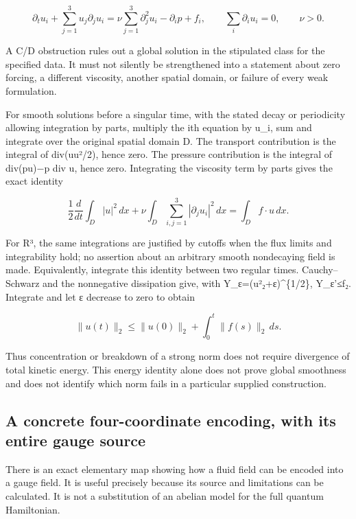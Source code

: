\[
\partial_tu_i+\sum_{j=1}^3u_j\partial_ju_i
=\nu\sum_{j=1}^3\partial_j^2u_i-\partial_ip+f_i,
\qquad \sum_i\partial_iu_i=0,\qquad \nu>0.
\]

A C/D obstruction rules out a global solution in the stipulated class
for the specified data. It must not silently be strengthened into a
statement about zero forcing, a different viscosity, another spatial
domain, or failure of every weak formulation.

For smooth solutions before a singular time, with the stated decay or
periodicity allowing integration by parts, multiply the ith equation by
u\_i, sum and integrate over the original spatial domain D. The
transport contribution is the integral of div(u\textbar u\textbar²/2),
hence zero. The pressure contribution is the integral of div(pu)−p div
u, hence zero. Integrating the viscosity term by parts gives the exact
identity

\[
\frac12\frac{d}{dt}\int_D|u|^2\,dx
+\nu\int_D\sum_{i,j=1}^3|\partial_ju_i|^2\,dx
=\int_D f\cdot u\,dx.
\]

For R³, the same integrations are justified by cutoffs when the flux
limits and integrability hold; no assertion about an arbitrary smooth
nondecaying field is made. Equivalently, integrate this identity between
two regular times. Cauchy--Schwarz and the nonnegative dissipation give,
with Y\_ε=(\textbar\textbar u\textbar\textbar²₂+ε)\^{}\{1/2\},
Y\_ε'≤\textbar\textbar f\textbar\textbar₂. Integrate and let ε decrease
to zero to obtain

\[
\|u(t)\|_2\leq\|u(0)\|_2+\int_0^t\|f(s)\|_2\,ds.
\]

Thus concentration or breakdown of a strong norm does not require
divergence of total kinetic energy. This energy identity alone does not
prove global smoothness and does not identify which norm fails in a
particular supplied construction.

\subsection{A concrete four-coordinate encoding, with its entire gauge
source}\label{gauge-and-navier-stokes-bridge-md-a-concrete-four-coordinate-encoding-with-its-entire-gauge-source}

There is an exact elementary map showing how a fluid field can be
encoded into a gauge field. It is useful precisely because its source
and limitations can be calculated. It is not a substitution of an
abelian model for the full quantum Hamiltonian.


